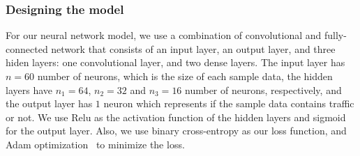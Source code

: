 \subsubsection{Designing the model}
For our neural network model, we use a combination of convolutional and fully-connected network that 
consists of an input layer, an output layer, and three hiden layers: one convolutional layer, and two dense layers. The input layer has $n=60$ number of neurons, which is the size of each sample data, the hidden layers have $n_1=64$, $n_2=32$ and $n_3 = 16$ number of neurons, respectively, and the output layer has $1$ neuron which represents if the sample data contains \bc 
traffic or not. We use Relu as the activation function of the hidden layers and 
sigmoid~\cite{deep_learning_book} for the output layer. Also, we use binary cross-entropy as our loss function, and Adam optimization~\cite{adam} to minimize the loss. %


























